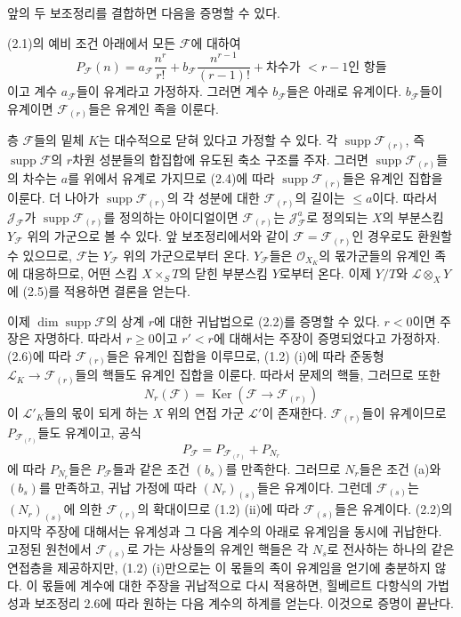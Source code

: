 앞의 두 보조정리를 결합하면 다음을 증명할 수 있다.

 (2.1)의 예비 조건 아래에서 모든 $\mathcal F$에
대하여
\[
P_{\mathcal F}(n)=a_{\mathcal F}\frac{n^r}{r!}
+b_{\mathcal F}\frac{n^{r-1}}{(r-1)!}
+\text{차수가 $<r-1$인 항들}
\]
이고 계수 $a_{\mathcal F}$들이 유계라고 가정하자. 그러면 계수
$b_{\mathcal F}$들은 아래로 유계이다. $b_{\mathcal F}$들이 유계이면
$\mathcal F_{(r)}$들은 유계인 족을 이룬다.

층 $\mathcal F$들의 밑체 $K$는 대수적으로 닫혀 있다고 가정할 수 있다.
각 $\operatorname{supp}\mathcal F_{(r)}$, 즉
$\operatorname{supp}\mathcal F$의 $r$차원 성분들의 합집합에 유도된
축소 구조를 주자. 그러면 $\operatorname{supp}\mathcal F_{(r)}$들의
차수는 $a$를 위에서 유계로 가지므로 (2.4)에 따라
$\operatorname{supp}\mathcal F_{(r)}$들은 유계인 집합을 이룬다. 더
나아가 $\operatorname{supp}\mathcal F_{(r)}$의 각 성분에 대한
$\mathcal F_{(r)}$의 길이는 $\leq a$이다. 따라서
$\mathcal J_{\mathcal F}$가 $\operatorname{supp}\mathcal F_{(r)}$를
정의하는 아이디얼이면 $\mathcal F_{(r)}$는
$\mathcal J_{\mathcal F}^{a}$로 정의되는 $X$의 부분스킴
$Y_{\mathcal F}$ 위의 가군으로 볼 수 있다. 앞 보조정리에서와 같이
$\mathcal F=\mathcal F_{(r)}$인 경우로도 환원할 수 있으므로,
$\mathcal F$는 $Y_{\mathcal F}$ 위의 가군으로부터 온다.
$Y_{\mathcal F}$들은 $\mathcal O_{X_K}$의 몫가군들의 유계인 족에
대응하므로, 어떤 스킴 $X\times_S T$의 닫힌 부분스킴 $Y$로부터 온다.
이제 $Y/T$와 $\mathcal L\otimes_XY$에 (2.5)를 적용하면 결론을 얻는다.

이제 $\dim\operatorname{supp}\mathcal F$의 상계 $r$에 대한 귀납법으로
(2.2)를 증명할 수 있다. $r<0$이면 주장은 자명하다. 따라서 $r\geq0$이고
$r'<r$에 대해서는 주장이 증명되었다고 가정하자. (2.6)에 따라
$\mathcal F_{(r)}$들은 유계인 집합을 이루므로, (1.2) (i)에 따라
준동형 $\mathcal L_K\longrightarrow\mathcal F_{(r)}$들의 핵들도
유계인 집합을 이룬다. 따라서 문제의 핵들, 그러므로 또한
\[
N_r(\mathcal F)=\operatorname{Ker}(\mathcal F\longrightarrow\mathcal F_{(r)})
\]
이 $\mathcal L'_K$들의 몫이 되게 하는 $X$ 위의 연접 가군
$\mathcal L'$이 존재한다. $\mathcal F_{(r)}$들이 유계이므로
$P_{\mathcal F_{(r)}}$들도 유계이고, 공식
\[
P_{\mathcal F}=P_{\mathcal F_{(r)}}+P_{N_r}
\]
에 따라 $P_{N_r}$들은 $P_{\mathcal F}$들과 같은 조건 $(b_s)$를
만족한다. 그러므로 $N_r$들은 조건 (a)와 $(b_s)$를 만족하고, 귀납
가정에 따라 $(N_r)_{(s)}$들은 유계이다. 그런데 $\mathcal F_{(s)}$는
$(N_r)_{(s)}$에 의한 $\mathcal F_{(r)}$의 확대이므로 (1.2) (ii)에 따라
$\mathcal F_{(s)}$들은 유계이다. (2.2)의 마지막 주장에 대해서는
유계성과 그 다음 계수의 아래로 유계임을 동시에 귀납한다. 고정된
원천에서 $\mathcal F_{(s)}$로 가는 사상들의 유계인 핵들은 각 $N_s$로
전사하는 하나의 같은 연접층을 제공하지만, (1.2) (i)만으로는 이
몫들의 족이 유계임을 얻기에 충분하지 않다. 이 몫들에 계수에 대한
주장을 귀납적으로 다시 적용하면, 힐베르트 다항식의 가법성과 보조정리
2.6에 따라 원하는 다음 계수의 하계를 얻는다.
이것으로 증명이 끝난다.

